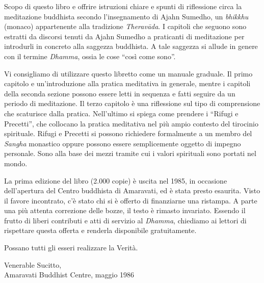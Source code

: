 
\vspace*{0.3\onelineskip}
Scopo di questo libro e offrire istruzioni chiare e spunti di
riflessione circa la meditazione buddhista secondo l'insegnamento di
Ajahn Sumedho, un \textit{bhikkhu} (monaco) appartenente alla tradizione
\textit{Theravāda}. I capitoli che seguono sono estratti da discorsi
tenuti da Ajahn Sumedho a praticanti di meditazione per introdurli in
concreto alla saggezza buddhista. A tale saggezza si allude in genere
con il termine \textit{Dhamma}, ossia le cose ``così come sono''.

Vi consigliamo di utilizzare questo libretto come un manuale graduale.
Il primo capitolo e un'introduzione alla pratica meditativa in generale,
mentre i capitoli della seconda sezione possono essere letti in sequenza
e fatti seguire da un periodo di meditazione. Il terzo capitolo è una
riflessione sul tipo di comprensione che scaturisce dalla pratica.
Nell'ultimo si spiega come prendere i ``Rifugi e Precetti”, che collocano
la pratica meditativa nel più ampio contesto del tirocinio spirituale.
Rifugi e Precetti si possono richiedere formalmente a un membro del
\textit{Sangha} monastico oppure possono essere semplicemente oggetto di impegno
personale. Sono alla base dei mezzi tramite cui i valori spirituali sono
portati nel mondo.

La prima edizione del libro (2.000 copie) è uscita nel 1985, in
occasione dell'apertura del Centro buddhista di Amaravati, ed è stata
presto esaurita. Visto il favore incontrato, c'è stato chi si è offerto
di finanziarne una ristampa. A parte una più attenta correzione delle
bozze, il testo è rimasto invariato. Essendo il frutto di liberi
contributi e atti di servizio al \textit{Dhamma}, chiediamo ai lettori di
rispettare questa offerta e renderla disponibile gratuitamente.

Possano tutti gli esseri realizzare la Verità.

\bigskip
{\par\raggedleft
Venerable Sucitto,\\
Amaravati Buddhist Centre, maggio 1986\\
\par}

